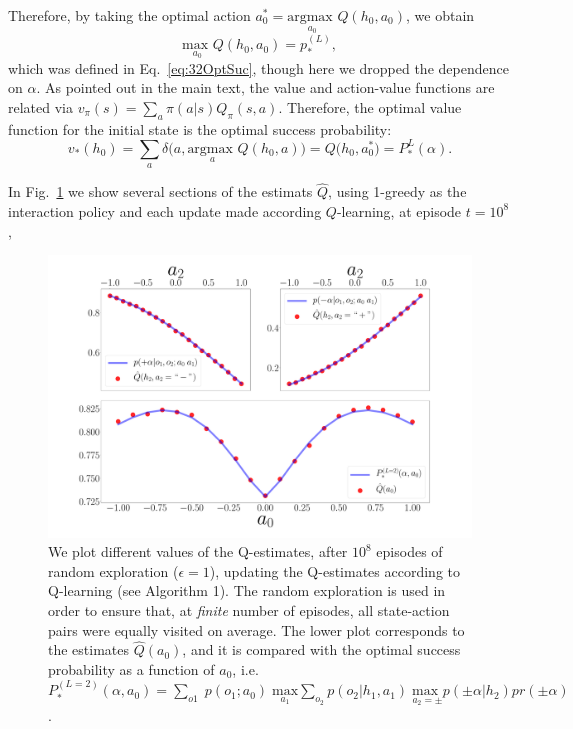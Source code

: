 Therefore, by taking the optimal action $a^{*}_0 = \underset{a_{0}}{\text{argmax }} Q(h_0,a_0)$, we obtain
\begin{equation}
  \underset{a_0}{\text{max }} Q(h_0,a_0) = p_*^{(L)},
\end{equation}
which was defined in Eq.~\ref{eq:32OptSuc}, though here we dropped the dependence on $\alpha$. As pointed out in the main text, the value and action-value functions are related via $v_\pi(s) = \sum_{a}\pi(a|s)Q_{\pi}(s,a)$. Therefore, the optimal value function for the initial state is the optimal success probability:
\begin{equation}
  v_*(h_0) = \sum_{a} \delta \big(a, \underset{a}{\text{argmax }} Q(h_0, a)) = Q(h_0, a^{*}_0 \big) = P_*^{L}(\alpha).
\end{equation}

In Fig.~\ref{fig:profiles} we show several sections of the estimats $\hat{Q}$, using 1-greedy as the interaction policy and each update made according $Q$-learning, at episode $t = 10^{8}$,

\begin{figure}[t]
    \centering
    \includegraphics[width=1.\textwidth]{Figures/315/qprofguess108.pdf}
    \caption{We plot different values of the Q-estimates, after $10^{8}$ episodes of random exploration ($\epsilon = 1$), updating the Q-estimates according to Q-learning (see Algorithm 1). The random exploration is used in order to ensure that, at \textit{finite} number of episodes, all state-action pairs were equally visited on average. The lower plot corresponds to the estimates $\hat{Q}(a_0)$, and it is compared with the optimal success probability as a function of $a_0$, i.e. $P_*^{(L=2)}(\alpha, a_0) =  \sum_{o1}\;p(o_1; a_0) \; \underset{a_1}{\text{max}} \sum_{o_2} p(o_2|h_1, a_1) \; \underset{a_2 = \pm}{\text{max }} p(\pm \alpha | h_2) pr(\pm \alpha)$.}
    \label{fig:profiles}
\end{figure}

